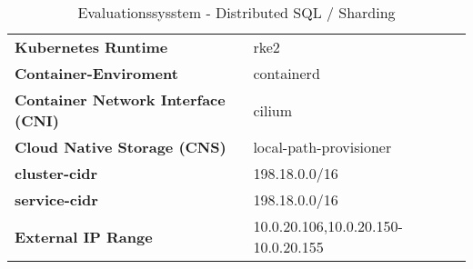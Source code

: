 \begin{table}[H]


\begin{tabular}{ll}
\toprule
\midrule
\textbf{Kubernetes Runtime} & rke2 \\
\textbf{Container-Enviroment} & containerd \\
\textbf{Container Network Interface (CNI)} & cilium \\
\textbf{Cloud Native Storage (CNS)} & local-path-provisioner \\
\textbf{cluster-cidr} & 198.18.0.0/16 \\
\textbf{service-cidr} & 198.18.0.0/16 \\
\textbf{External IP Range} & 10.0.20.106,10.0.20.150-10.0.20.155 \\
\bottomrule
\end{tabular}
\caption{Evaluationssysstem - Distributed SQL / Sharding} \label{evaluation_distributed_sql}
\end{table}
